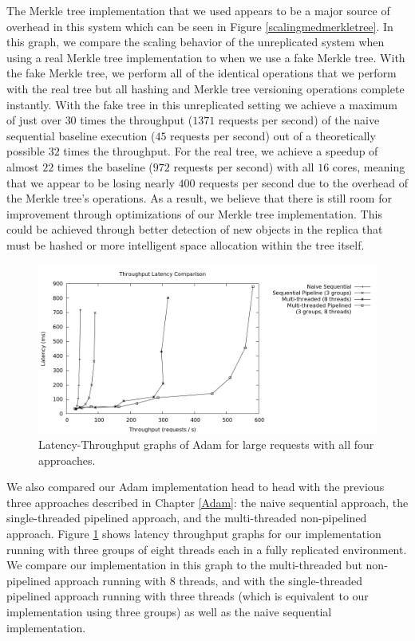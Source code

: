 \documentclass[11pt, oneside]{report}
\begin{document}
The Merkle tree implementation that we used appears to be a major source of overhead in this system which can be seen in Figure \ref{scalingmedmerkletree}. 
In this graph, we compare the scaling behavior of the unreplicated system when using a real Merkle tree implementation to when we use a fake Merkle tree.
With the fake Merkle tree, we perform all of the identical operations that we perform with the real tree but all hashing and Merkle tree versioning operations complete instantly.
With the fake tree in this unreplicated setting we achieve a maximum of just over $30$ times the throughput ($1371$ requests per second) of the naive sequential baseline execution ($45$ requests per second) out of a theoretically possible $32$ times the throughput.
For the real tree, we achieve a speedup of almost $22$ times the baseline ($972$ requests per second) with all $16$ cores, meaning that we appear to be losing nearly $400$ requests per second due to the overhead of the Merkle tree's operations.
As a result, we believe that there is still room for improvement through optimizations of our Merkle tree implementation.
This could be achieved through better detection of new objects in the replica that must be hashed or more intelligent space allocation within the tree itself.

\begin{figure}[h]
\centering
\includegraphics[width=1.0\textwidth]{graphs/latencythroughput/graph.png}
\caption{\label{head2head}Latency-Throughput graphs of Adam for large requests with all four approaches.}
\end{figure}

We also compared our Adam implementation head to head with the previous three approaches described in Chapter \ref{Adam}: the naive sequential approach, the single-threaded pipelined approach, and the multi-threaded non-pipelined approach. 
Figure \ref{head2head} shows latency throughput graphs for our implementation running with three groups of eight threads each in a fully replicated environment. 
We compare our implementation in this graph to the multi-threaded but non-pipelined approach running with 8 threads, and with the single-threaded pipelined approach running with three threads (which is equivalent to our implementation using three groups) as well as the naive sequential implementation. 
\end{document}
